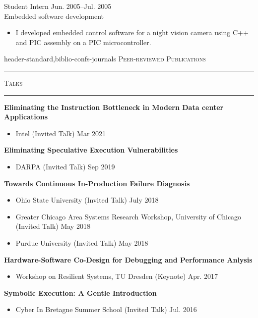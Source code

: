 \documentclass[10pt]{article}
\newcommand{\mysec}[1]{\vspace{2em}\textsc{\large #1}\vspace{1mm}\hrule\vspace{2mm}}
\newcommand{\mysub}[3]{\textbf{#1} {#2} \hfill {\em #3}}
\newcommand{\myssub}[1]{\hspace*{2mm}\parbox{163mm}{#1}\vspace*{2mm}}
\begin{document}
\myssub{Student Intern \hfill Jun. 2005--Jul. 2005 \\
Embedded software development
\vspace{-1mm}
\begin{itemize}
\setlength\itemsep{0em}
\item{I developed embedded control software for a night vision camera using C++ and PIC assembly on a PIC microcontroller.}
\end{itemize}
}




\begin{btSect}{header-standard,biblio-confs-journals}
\mysec{Peer-reviewed Publications}
\btPrintAll
\end{btSect}

\mysec{Talks}
\mysub{Eliminating the Instruction Bottleneck in Modern Data center Applications}{}{}
\vspace{-2mm}
\begin{itemize}
  \setlength\itemsep{0em}
\item{Intel (Invited Talk)} \hfill Mar 2021
\end{itemize}
\mysub{Eliminating Speculative Execution Vulnerabilities}{}{}
\vspace{-2mm}
\begin{itemize}
  \setlength\itemsep{0em}
\item{DARPA (Invited Talk)} \hfill Sep 2019
\end{itemize}
\mysub{Towards Continuous In-Production Failure Diagnosis}{}{}
\vspace{-2mm}
\begin{itemize}
  \setlength\itemsep{0em}
\item{Ohio State University (Invited Talk)} \hfill July 2018
\item{Greater Chicago Area Systems Research Workshop, University of Chicago (Invited Talk)} \hfill May 2018
\item{Purdue University (Invited Talk)} \hfill May 2018
\end{itemize}
\mysub{Hardware-Software Co-Design for Debugging and Performance Anlysis}{}{}
\vspace{-2mm}
\begin{itemize}
  \setlength\itemsep{0em}
  \item{Workshop on Resilient Systems, TU Dresden (Keynote)} \hfill Apr. 2017
\end{itemize}
\mysub{Symbolic Execution: A Gentle Introduction}{}{}
\vspace{-2mm}
\begin{itemize}
  \setlength\itemsep{0em}
  \item{Cyber In Bretagne Summer School (Invited Talk)} \hfill Jul. 2016
\end{itemize}
\end{document}
